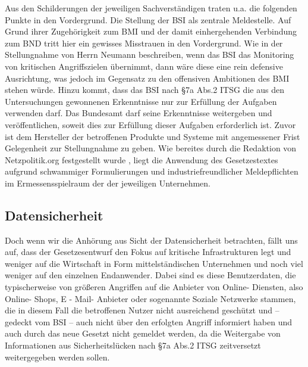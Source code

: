 \documentclass[a4paper,letterpaper,twocolumn,9,5pt,ngerman]{article}
\begin{document}
Aus den Schilderungen der jeweiligen Sachverständigen traten u.a. die folgenden Punkte in den Vordergrund. Die Stellung der BSI als zentrale Meldestelle. Auf Grund ihrer Zugehörigkeit zum BMI und der damit einhergehenden Verbindung zum BND tritt hier ein gewisses Misstrauen in den Vordergrund. Wie in der Stellungnahme von Herrn Neumann \cite[vlg.][S. 4]{NeuCCC15}  beschreiben, wenn das BSI das Monitoring von kritischen Angriffszielen übernimmt, dann wäre diese eine rein defensive Ausrichtung, was jedoch im Gegensatz zu den offensiven Ambitionen des BMI stehen würde. Hinzu kommt, dass das BSI nach §7a Abs.2 ITSG die aus den Untersuchungen gewonnenen Erkenntnisse nur zur Erfüllung der Aufgaben verwenden darf. Das Bundesamt darf seine Erkenntnisse weitergeben und veröffentlichen, soweit dies zur Erfüllung dieser Aufgaben erforderlich ist. Zuvor ist dem Hersteller der betroffenen Produkte und Systeme mit angemessener Frist Gelegenheit zur Stellungnahme zu geben. Wie bereites durch die Redaktion von Netzpolitik.org festgestellt wurde \cite{Bis15}, liegt die Anwendung des Gesetzestextes aufgrund schwammiger Formulierungen und industriefreundlicher Meldepflichten im Ermessensspielraum der der jeweiligen Unternehmen. 

\subsection{Datensicherheit}
\label{sub:Datensicherheit}
Doch wenn wir die Anhörung aus Sicht der Datensicherheit betrachten, fällt uns auf, dass der Gesetzesentwurf den Fokus auf kritische Infrastrukturen legt und weniger auf die Wirtschaft in Form mittelständischen Unternehmen und noch viel weniger auf den einzelnen Endanwender. Dabei sind es diese Benutzerdaten, die typischerweise von größeren Angriffen auf die Anbieter
von Online- Diensten, also Online- Shops, E - Mail- Anbieter oder sogenannte Soziale Netzwerke stammen, die in diesem Fall die betroffenen Nutzer nicht ausreichend geschützt und – gedeckt vom BSI – auch nicht über den erfolgten Angriff
informiert haben und auch durch das neue Gesetzt nicht gemeldet werden, da die Weitergabe von Informationen  aus Sicherheitslücken nach §7a Abs.2 ITSG zeitversetzt weitergegeben werden sollen.
\end{document}

